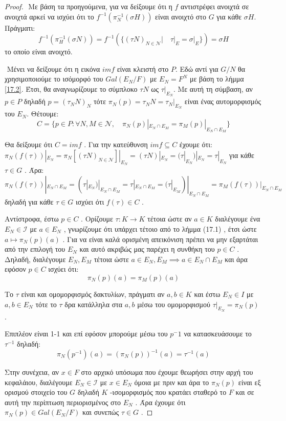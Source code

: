 \documentclass[oneside,a4paper]{article}
\begin{document}
\begin{proof}
$ $\newline
\noindent Με βάση τα προηγούμενα, για να δείξουμε ότι η $f$ αντιστρέφει ανοιχτά σε ανοιχτά αρκεί να ισχύει ότι το $f^{-1} (\pi^{-1}_N (\sigma H))$ είναι ανοιχτό στο $G$ για κάθε $\sigma H$. Πράγματι:
$$f^{-1} (\pi^{-1}_H (\sigma N)) = f^{-1} (\{(\tau N)_{N \in \mathcal{N}} | \quad \tau|_E = \sigma|_E \}) = \sigma H$$
το οποίο είναι ανοιχτό.

$ $\newline
\noindent Μένει να δείξουμε ότι η εικόνα $imf$ είναι κλειστή στο $P$. Εδώ αντί για $G/N$ θα χρησιμοποιούμε το ισόμορφό του $Gal(E_N / F)$ με $E_N = F^N$ με βάση το λήμμα \ref{17.2}. Έτσι, θα αναγνωρίζουμε το σύμπλοκο $\tau N$ ως $\tau|_{E_N}$. Με αυτή τη σύμβαση, αν $p \in P$ δηλαδή $p = (\tau_N N)_{N}$ τότε $\pi_N (p) = \tau_N N = \tau_N |_{E_N}$ είναι ένας αυτομορφισμός του $E_N$. Θέτουμε:
$$C = \{ p \in P: \forall N,M \in \mathcal{N} ,\quad \pi_N (p) |_{E_N \cap E_M} = \pi_M(p)|_{E_N \cap E_M}\}$$

Θα δείξουμε ότι $C=imf$ . Για την κατεύθυνση $imf \subseteq C$ έχουμε ότι:
$\pi_N (f(\tau))|_{E_N} =\pi_N [(\tau N)_{N \in \mathcal{N}}]|_{E_N} = (\tau N) |_{E_N} = (\tau|_{E_N})|_{E_N} = \tau|_{E_N}$ για κάθε $\tau \in G$ . Άρα:
$$\pi_N (f(\tau))|_{E_N \cap E_M}=(\tau|_{E_N})|_{E_N \cap E_M} = \tau|_{E_N \cap E_M} = (\tau|_{E_M})|_{E_N \cap E_M} =\pi_M (f(\tau))|_{E_N \cap E_M}$$
δηλαδή για κάθε $\tau \in G$ ισχύει ότι $f(\tau) \in C$ .

Αντίστροφα, έστω $p \in C$ . Ορίζουμε $\tau : K \rightarrow K$ τέτοια ώστε αν $a \in K$ διαλέγουμε ένα $E_N \in \mathcal{I}$ με $a \in E_N$ , γνωρίζουμε ότι υπάρχει τέτοιο από το λήμμα (17.1) , έτσι ώστε $a \mapsto \pi_N (p) (a)$ . Για να είναι καλά ορισμένη απεικόνιση πρέπει να μην εξαρτάται από την επιλογή του $E_N$ και αυτό ακριβώς μας παρέχει η συνθήκη του $p \in C$ . Δηλαδή, διαλέγουμε $E_N, E_M$ τέτοια ώστε $a \in E_N, E_M \implies a \in E_N \cap E_M$ και άρα εφόσον $p \in C$ ισχύει ότι:
$$\pi_N (p) (a) =  \pi_M (p) (a)$$
 

Το $\tau$ είναι και ομομορφισμός δακτυλίων, πράγματι αν $a,b \in K$ και έστω $E_N \in I$ με $a,b \in E_N$ τότε το $\tau$ δρα κατάλληλα στα $a,b$ μέσω του ομομορφισμού $\tau|_{E_N} = \pi_N (p)$ .

Επιπλέον είναι 1-1 και επί εφόσον μπορούμε μέσω του $p^-1$ να κατασκευάσουμε το $\tau^{-1}$ δηλαδή:
$$\pi_N (p^{-1}) (a) = (\pi_N (p))^{-1} (a) = \tau^{-1} (a)$$

Στην συνέχεια, αν $x \in F$ στο αρχικό υπόσωμα που έχουμε θεωρήσει στην αρχή του κεφαλάιου, διαλέγουμε $E_N \in \mathcal{I}$ με $x \in E_N$ όμοια με πριν και άρα το $\pi_N (p)$ είναι εξ ορισμού στοιχείο του $G$ δηλαδή $K$ -ισομορφισμός που κρατάει σταθερό το $F$ και σε αυτή την περίπτωση περιορισμένος στο $E_N$ . Άρα έχουμε ότι $\pi_N (p) \in Gal(E_N/F)$ και συνεπώς $\tau \in G$ .


\end{proof}
\end{document}
